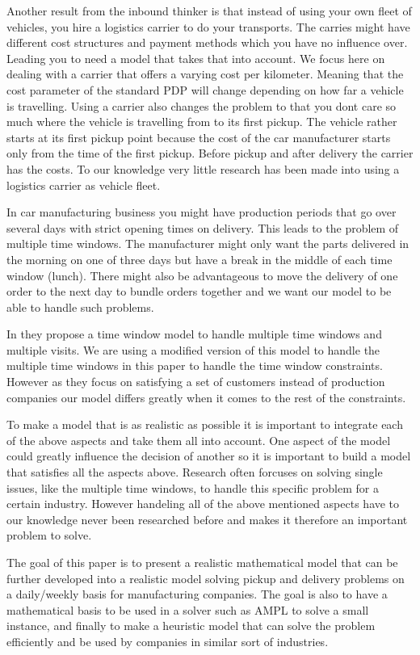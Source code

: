 \documentclass[a4paper,10pt]{article}
\begin{document}
Another result from the inbound thinker is that instead of using your own fleet of vehicles, you hire a logistics carrier to do your transports.
The carries might have different cost structures and payment methods which you have no influence over.
Leading you to need a model that takes that into account.
We focus here on dealing with a carrier that offers a varying cost per kilometer.
Meaning that the cost parameter of the standard PDP will change depending on how far a vehicle is travelling. 
Using a carrier also changes the problem to that you dont care so much where the vehicle is travelling from to its first pickup.   
The vehicle rather starts at its first pickup point because the cost of the car manufacturer starts only from the time of the first pickup.
Before pickup and after delivery the carrier has the costs. To our knowledge very little research has been made into using a logistics carrier as vehicle fleet. \par

In car manufacturing business you might have production periods that go over several days with strict opening times on delivery. 
This leads to the problem of multiple time windows.
The manufacturer might only want the parts delivered in the morning on one of three days but have a break in the middle of each time window (lunch). 
There might also be advantageous to move the delivery of one order to the next day to bundle orders together and we want our model to be able to handle such problems. \par
In \cite{favaretto07} they propose a time window model to handle multiple time windows and multiple visits. 
We are using a modified version of this model to handle the multiple time windows in this paper to handle the time window constraints.
However as they focus on satisfying a set of customers instead of production companies our model differs greatly when it comes to the rest of the constraints.\par
\par
To make a model that is as realistic as possible it is important to integrate each of the above aspects and take them all into account. 
One aspect of the model could greatly influence the decision of another so it is important to build a model that satisfies all the aspects above. 
Research often forcuses on solving single issues, like the multiple time windows, to handle this specific problem for a certain industry. 
However handeling all of the above mentioned aspects have to our knowledge never been researched before and makes it therefore an important problem to solve. 
\par
The goal of this paper is to present a realistic mathematical model that can be further developed into a realistic model solving pickup and delivery problems on a daily/weekly basis for manufacturing companies. 
The goal is also to have a mathematical basis to be used in a solver such as AMPL to solve a small instance, and finally to make a heuristic model that can solve the problem efficiently and be used by companies in similar sort of industries.
\end{document}
